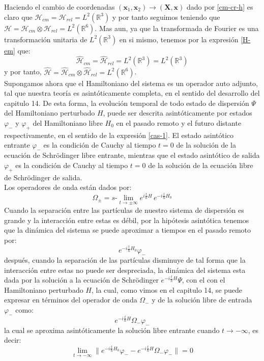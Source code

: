 \documentclass[12pt]{book}
\numberwithin{equation}{chapter}
\def\R{\mathbb{R}}
\def\rar{\rightarrow}
\def\H{\mathcal{H}}
\def\pr{\otimes}
\def\x{\mathbf{x}}
\def\xx{\mathbf{X}}
\def\O{\Omega}
\def\slim{s\mbox{-}\lim}
\begin{document}
Haciendo el cambio de coordenadas $ (\x_{1},\x_{2}) \rar ( \xx , \x) $ dado por \eqref{cm-cr-h} es claro que $\H_{cm}= \H_{rel}= L^{2}(\R^{3})$ y por tanto seguimos teniendo que $\H= \H_{cm} \pr \H_{rel}= L^{2}(\R^{6}) $. Mas aun, ya que la transformada de Fourier es una transformaci\'on unitaria de $L^{2}(\R^{3})$ en si mismo, tenemos por la expresi\'on \eqref{H-em} que: $$\hat{\H}_{cm}=\hat{\H}_{rel}=L^{2}(\R^{3})= L^{2}(\R^{3}) $$
y por tanto, $ \hat{\H}= \hat{\H}_{cm} \pr \hat{\H}_{rel}=L^{2}(\R^{6}) $.\\

Supongamos ahora que el Hamiltoniano del sistema es un operador auto adjunto, tal que nuestra teor\'ia es asint\'oticamente completa, en el sentido del desarrollo del capitulo 14. De esta forma, la evoluci\'on temporal de todo estado de dispersi\'on $\Psi$ del Hamiltoniano perturbado $H$, puede ser descrita asint\'oticamente por estados $\varphi_{-}$ y $\varphi_{+}$ del Hamiltoniano libre $H_{0}$ en el pasado remoto y el futuro distante respectivamente, en el sentido de la expresi\'on \eqref{cas-1}. El estado asint\'otico entrante $\varphi_{-}$ es la condici\'on de Cauchy al tiempo $t=0$ de la soluci\'on de la ecuaci\'on de Schr\"odinger libre entrante, mientras que el estado asint\'otico de salida $\varphi_{+}$ es la condici\'on de Cauchy al tiempo $t=0$ de la soluci\'on de la ecuaci\'on libre de Schr\"odinger de salida.\\

Los operadores de onda est\'an dados por:
$$ \O_{\pm}= \slim_{t \rar \pm\infty} e^{i\frac{t}{\hbar}H }\, e^{-i \frac{t}{\hbar}H_{0}} $$
Cuando la separaci\'on entre las part\'iculas de nuestro sistema de dispersi\'on es grande y la interacci\'on entre estas es d\'ebil, por la hip\'otesis asint\'otica tenemos que la din\'amica del sistema se puede aproximar a tiempos en el pasado remoto por:
$$ e^{-i\frac{t}{\hbar}H_{0} } \varphi_{-} $$
despu\'es, cuando la separaci\'on de las part\'iculas disminuye de tal forma que la interacci\'on entre estas no puede ser despreciada, la din\'amica del sistema esta dada por la soluci\'on a la ecuaci\'on de Schr\"odinger $e^{-i \frac{t}{\hbar}H} \Psi$, con el con el Hamiltoniano perturbado $H$, la cual, como vimos en el capitulo 14, se puede expresar en t\'erminos del operador de onda $\O_{-}$ y de la soluci\'on libre de entrada $\varphi_{-}$ como:
\begin{equation}\label{Opsi-}
e^{-i \frac{t}{\hbar}H} \O_{-} \varphi_{-}
\end{equation}
la cual se aproxima asint\'oticamente la soluci\'on libre entrante cuando $t \rar -\infty$, es decir:
$$ \lim_{t \rar -\infty} \| e^{-i\frac{t}{\hbar} H_{0}} \varphi_{-} - e^{-i\frac{t}{\hbar} H} \O_{-} \varphi_{-} \|=0 $$
\end{document}
